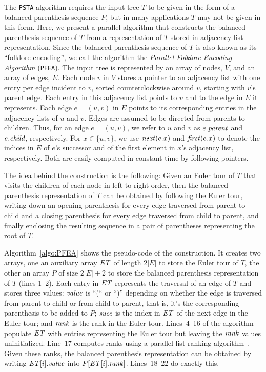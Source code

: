 The {\tt PSTA} algorithm requires the input tree $T$ to be given in the form
of a balanced parenthesis sequence $P$, but in many applications $T$ may not
be given in this form.
Here, we present a parallel algorithm that constructs the balanced parenthesis
sequence of $T$ from a representation of $T$ stored in adjacency list
representation.
Since the balanced parenthesis sequence of $T$ is also known as its
``folklore encoding'', we call the algorithm the
\emph{Parallel Folklore Encoding Algorithm} ({\tt PFEA}).
The input tree is represented by an array of nodes, $V$, and an array of edges,
$E$.
Each node $v$ in $V$ stores a pointer to an adjacency list with one entry per
edge incident to $v$, sorted counterclockwise around $v$, starting with $v$'s
parent edge.
Each entry in this adjacency list points to $v$ and to the edge in $E$ it
represents.
Each edge $e=(u,v)$ in $E$ points to its corresponding entries in the adjacency
lists of $u$ and $v$.
Edges are assumed to be directed from parents to children.
Thus, for an edge $e = (u, v)$, we refer to $u$ and $v$ as $e.\mathit{parent}$ and
$e.\mathit{child}$, respectively.
For $x \in \{u, v\}$, we use $\mathit{next}(e.x)$ and $\mathit{first}(e.x)$ to denote
the indices in $E$ of $e$'s successor and of the first element in $x$'s
adjacency list, respectively.
Both are easily computed in constant time by following pointers.

The idea behind the construction is the following: Given an Euler tour of $T$
that visits the children of each node in left-to-right order, then the balanced
parenthesis representation of $T$ can be obtained by following the Euler tour,
writing down an opening parenthesis for every edge traversed from parent to child
and a closing parenthesis for every edge traversed from child to parent, and
finally enclosing the resulting sequence in a pair of parentheses representing
the root of $T$.

Algorithm~\ref{algo:PFEA} shows the pseudo-code of the construction.
It creates two arrays, one an auxiliary array $\mathit{ET}$ of length $2|E|$ to
store the Euler tour of $T$, the other an array $P$ of size $2|E|+2$ to store
the balanced parenthesis representation of $T$ (lines 1--2).
Each entry in $\mathit{ET}$ represents the traversal of an edge of $T$ and stores
three values: $\mathit{value}$ is ``(`` or ``)'' depending on whether the edge is
traversed from parent to child or from child to parent, that is, it's the
corresponding parenthesis to be added to $P$; $\mathit{succ}$ is the index in
$\mathit{ET}$ of the next edge in the Euler tour; and $\mathit{rank}$ is the rank in
the Euler tour.
Lines~4--16 of the algorithm populate $\mathit{ET}$ with entries representing
the Euler tour but leaving the $\mathit{rank}$ values uninitialized.
Line~17 computes ranks using a parallel list ranking algorithm~\cite{Helman2001265}.
Given these ranks, the balanced parenthesis representation can be obtained by
writing $\mathit{ET}[i].\mathit{value}$ into $P[\mathit{ET}[i].\mathit{rank}]$.
Lines~18--22 do exactly this.

